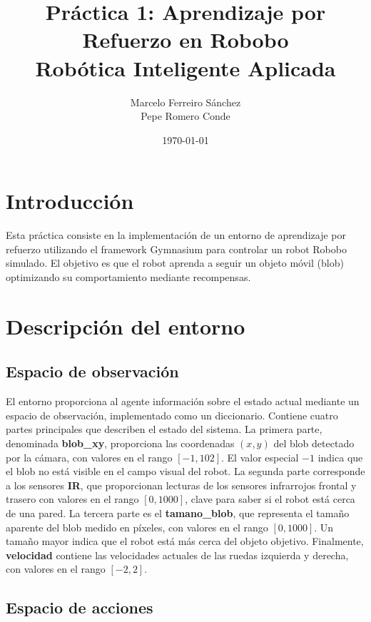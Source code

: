 \documentclass[12pt,a4paper]{article}
\title{Práctica 1: Aprendizaje por Refuerzo en Robobo\\
\large Robótica Inteligente Aplicada}
\author{Marcelo Ferreiro Sánchez\\ Pepe Romero Conde}
\date{\today}
\begin{document}
\maketitle

\tableofcontents

\newpage

\section{Introducción}

Esta práctica consiste en la implementación de un entorno de aprendizaje por
refuerzo utilizando el framework Gymnasium para controlar un robot Robobo
simulado. El objetivo es que el robot aprenda a seguir un objeto móvil (blob)
optimizando su comportamiento mediante recompensas.

\section{Descripción del entorno}

\subsection{Espacio de observación}

El entorno proporciona al agente información sobre el estado actual mediante un
espacio de observación, implementado como un diccionario. Contiene cuatro
partes principales que describen el estado del sistema. La primera
parte, denominada \textbf{blob\_xy}, proporciona las coordenadas $(x, y)$
del blob detectado por la cámara, con valores en el rango $[-1, 102]$. El valor
especial $-1$ indica que el blob no está visible en el campo visual del robot.
La segunda parte corresponde a los sensores \textbf{IR}, que proporcionan
lecturas de los sensores infrarrojos frontal y trasero con valores en el rango
$[0, 1000]$, clave para saber si el robot está cerca de una pared. La tercera parte es el \textbf{tamano\_blob}, que representa el
tamaño aparente del blob medido en píxeles, con valores en el rango $[0, 1000]$.
Un tamaño mayor indica que el robot está más cerca del objeto objetivo.
Finalmente, \textbf{velocidad} contiene las velocidades actuales
de las ruedas izquierda y derecha, con valores en el rango $[-2, 2]$.

\subsection{Espacio de acciones}
\end{document}

